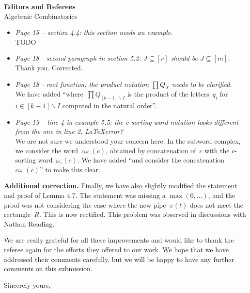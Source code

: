 \documentclass{letter}
\begin{document}
\begin{letter}{{\bf Editors and Referees} \\ Algebraic Combinatorics}
\begin{itemize}
\item \textsl{\color{gray} Page 15 -- section 4.4: this section needs an example.} \\
{\color{red} TODO}

\item \textsl{\color{gray} Page 18 - second paragraph in section 5.2: $J\subseteq [r]$ should be $J\subseteq [m]$.} \\
Thank you. Corrected.

\item \textsl{\color{gray} Page 18 - root function: the product notation $\prod Q_X$ needs to be clarified.} \\
We have added ``where~$\prod Q_{[k-1]\smallsetminus I}$ is the product of the letters~$q_i$ for~$i \in [k-1] \smallsetminus I$ computed in the natural order''.

\item \textsl{\color{gray} Page 19 -- line 4 in example 5.5: the c-sorting word notation looks different from the one in line 2, \LaTeX error?} \\
We are not sure we understood your concern here. In the subword complex, we consider the word~$c\omega_\circ(c)$, obtained by concatenation of~$c$ with the $c$-sorting word~$\omega_\circ(c)$. We have added ``and consider the concatenation~$c\omega_\circ(c)$'' to make this clear.

\end{itemize}

{\bf Additional correction.}
Finally, we have also slightly modified the statement and proof of Lemma 4.7.
The statement was missing a $\max(0, \dots)$, and the proof was not considering the case where the new pipe~$\pi(t)$ does not meet the rectangle~$R$.
This is now rectified.
This problem was observed in discussions with Nathan Reading.

We are really grateful for all these improvements and would like to thank the referee again for the efforts they offered to our work. We hope that we have addressed their comments carefully, but we will be happy to have any further comments on this submission.

%

\closing{Sincerely yours,}

\end{letter}
\end{document}
